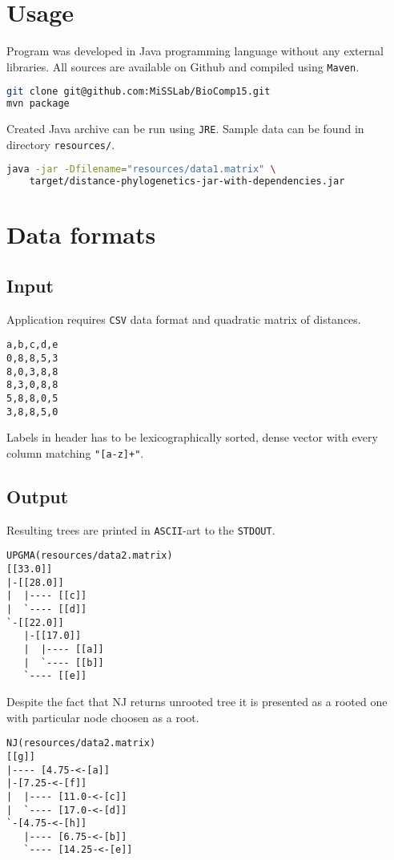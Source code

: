 \documentclass[a4paper,10pt]{article}
\begin{document}
\section{Usage}
Program was developed in Java programming language without any external libraries. All sources are available on Github and compiled using \texttt{Maven}.
\begin{lstlisting}[language=bash,caption={Building project}]
git clone git@github.com:MiSSLab/BioComp15.git
mvn package
\end{lstlisting}
Created Java archive can be run using \texttt{JRE}. Sample data can be found in directory \texttt{resources/}.
\begin{lstlisting}[language=bash,caption={Running project using data1.matrix}]
java -jar -Dfilename="resources/data1.matrix" \
    target/distance-phylogenetics-jar-with-dependencies.jar
\end{lstlisting}

\section{Data formats}
\subsection{Input}
Application requires \texttt{CSV} data format and quadratic matrix of distances.

\begin{lstlisting}[caption={Example data file content}]
a,b,c,d,e
0,8,8,5,3
8,0,3,8,8
8,3,0,8,8
5,8,8,0,5
3,8,8,5,0
\end{lstlisting}
Labels in header has to be lexicographically sorted, dense vector with every column matching \texttt{"[a-z]+"}.
\subsection{Output}
Resulting trees are printed in \texttt{ASCII}-art to the \texttt{STDOUT}.
\begin{lstlisting}[caption={UPGMA output}]
UPGMA(resources/data2.matrix)
[[33.0]]
|-[[28.0]]
|  |---- [[c]]
|  `---- [[d]]
`-[[22.0]]
   |-[[17.0]]
   |  |---- [[a]]
   |  `---- [[b]]
   `---- [[e]]
\end{lstlisting}


Despite the fact that NJ returns unrooted tree it is presented as a rooted one with particular node choosen as a root.
\begin{lstlisting}[caption={NJ output}]
NJ(resources/data2.matrix)
[[g]]
|---- [4.75-<-[a]]
|-[7.25-<-[f]]
|  |---- [11.0-<-[c]]
|  `---- [17.0-<-[d]]
`-[4.75-<-[h]]
   |---- [6.75-<-[b]]
   `---- [14.25-<-[e]]
\end{lstlisting}
\end{document}
